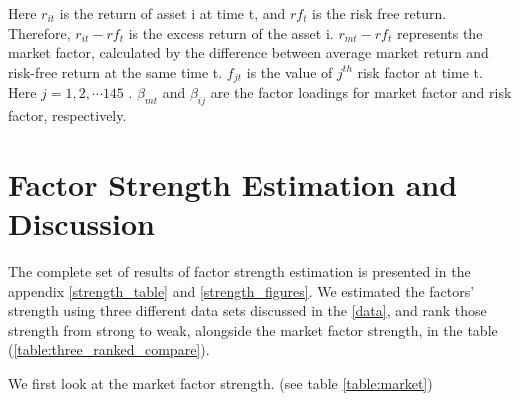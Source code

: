 Here $r_{it}$ is the return of asset i at time t, and $rf_t$ is the risk free return.
Therefore, $r_{it} - rf_t$ is the excess return of the asset i.
$r_{mt} - rf_{t}$ represents the market factor, calculated by the difference between average market return and risk-free return at the same time t.
$f_{jt}$ is the value of $j^{th}$ risk factor  at time t. 
Here $j = 1, 2, \cdots 145$ . 
$\beta_{mt}$ and $\beta_{ij}$ are the factor loadings for market factor and risk factor, respectively.




	\section{Factor Strength Estimation and Discussion}
The complete set of results of factor strength estimation is presented in the appendix \ref{strength_table} and \ref{strength_figures}.
We estimated the factors' strength using three different data sets discussed in the \ref{data}, and rank those strength from strong to weak, alongside the market factor strength, in the table (\ref{table:three_ranked_compare}).

We first look at the market factor strength. (see table \ref{table:market})


